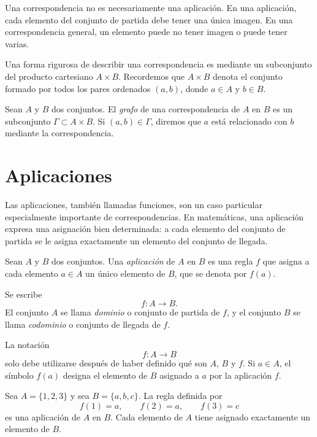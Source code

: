 \begin{advertencia}
Una correspondencia no es necesariamente una aplicación. En una aplicación, cada elemento del conjunto de partida debe tener una única imagen. En una correspondencia general, un elemento puede no tener imagen o puede tener varias.
\end{advertencia}

Una forma rigurosa de describir una correspondencia es mediante un subconjunto del producto cartesiano \(A\times B\). Recordemos que \(A\times B\) denota el conjunto formado por todos los pares ordenados \((a,b)\), donde \(a\in A\) y \(b\in B\).

\begin{definicion}
Sean \(A\) y \(B\) dos conjuntos. El \emph{grafo} de una correspondencia de \(A\) en \(B\) es un subconjunto \(\Gamma\subset A\times B\). Si \((a,b)\in\Gamma\), diremos que \(a\) está relacionado con \(b\) mediante la correspondencia.
\end{definicion}

\section{Aplicaciones}

Las aplicaciones, también llamadas funciones, son un caso particular especialmente importante de correspondencias. En matemáticas, una aplicación expresa una asignación bien determinada: a cada elemento del conjunto de partida se le asigna exactamente un elemento del conjunto de llegada.

\begin{definicion}[Aplicación]
Sean \(A\) y \(B\) dos conjuntos. Una \emph{aplicación} de \(A\) en \(B\) es una regla \(f\) que asigna a cada elemento \(a\in A\) un único elemento de \(B\), que se denota por \(f(a)\).

Se escribe
\[
f:A\longrightarrow B.
\]
El conjunto \(A\) se llama \emph{dominio} o conjunto de partida de \(f\), y el conjunto \(B\) se llama \emph{codominio} o conjunto de llegada de \(f\).
\end{definicion}

La notación
\[
f:A\longrightarrow B
\]
solo debe utilizarse después de haber definido qué son \(A\), \(B\) y \(f\). Si \(a\in A\), el símbolo \(f(a)\) designa el elemento de \(B\) asignado a \(a\) por la aplicación \(f\).

\begin{ejemplo}
Sea \(A=\{1,2,3\}\) y sea \(B=\{a,b,c\}\). La regla definida por
\[
f(1)=a,\qquad f(2)=a,\qquad f(3)=c
\]
es una aplicación de \(A\) en \(B\). Cada elemento de \(A\) tiene asignado exactamente un elemento de \(B\).
\end{ejemplo}

